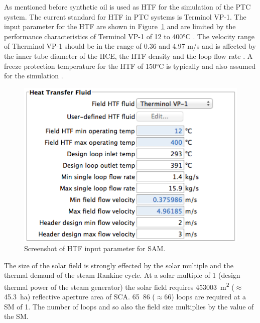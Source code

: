As mentioned before synthetic oil is used as HTF for the simulation of the PTC system. The current standard for HTF in PTC systems is Terminol VP-1. The input parameter for the HTF are shown in Figure~\ref{PTC_HTF} and are limited by the performance characteristics of Terminol VP-1 of 12 to 400\si{\celsius} \cite{Therminol2015}. The velocity range of Therminol VP-1 should be in the range of 0.36 and 4.97 m/s \cite{Wagner2014} and is affected by the inner tube diameter of the HCE, the HTF density and the loop flow rate \cite{NREL2015a}. A freeze protection temperature for the HTF of 150\si{\celsius} is typically and also assumed for the simulation \cite{Kearney2002}.
\begin{figure}[htbp]  
\centering
\includegraphics[width=0.6\linewidth]{FIG/PTC_HTF}
\caption[Screenshot of HTF input parameter for SAM.]{Screenshot of HTF input parameter for SAM.}\label{PTC_HTF}
\end{figure}


The size of the solar field is strongly effected by the solar multiple and the thermal demand of the steam Rankine cycle. At a solar multiple of \si{1} (design thermal power of the steam generator) the solar field requires \SI{453003}{\square\metre} ($\approx$\SI{45.3}{ha}) reflective aperture area of SCA. \si{65.86} ($\approx$66) loops are required at a SM of \si{1}. The number of loops and so also the field size multiplies by the value of the SM.



